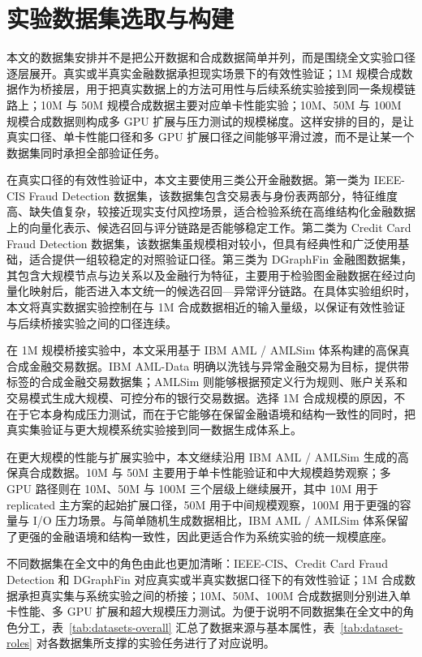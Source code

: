 \FloatBarrier

\section{实验数据集选取与构建}

本文的数据集安排并不是把公开数据和合成数据简单并列，而是围绕全文实验口径逐层展开。真实或半真实金融数据承担现实场景下的有效性验证；1M 规模合成数据作为桥接层，用于把真实数据上的方法可用性与后续系统实验接到同一条规模链路上；10M 与 50M 规模合成数据主要对应单卡性能实验；10M、50M 与 100M 规模合成数据则构成多 GPU 扩展与压力测试的规模梯度\citep{ibm_aml_data,ibm_amlsim}。这样安排的目的，是让真实口径、单卡性能口径和多 GPU 扩展口径之间能够平滑过渡，而不是让某一个数据集同时承担全部验证任务。

在真实口径的有效性验证中，本文主要使用三类公开金融数据。第一类为 IEEE-CIS Fraud Detection 数据集，该数据集包含交易表与身份表两部分，特征维度高、缺失值复杂，较接近现实支付风控场景，适合检验系统在高维结构化金融数据上的向量化表示、候选召回与评分链路是否能够稳定工作\citep{ieee_cis_fraud}。第二类为 Credit Card Fraud Detection 数据集，该数据集虽规模相对较小，但具有经典性和广泛使用基础，适合提供一组较稳定的对照验证口径\citep{dalpozzolo2015creditcard,creditcardfraud_kaggle}。第三类为 DGraphFin 金融图数据集，其包含大规模节点与边关系以及金融行为特征，主要用于检验图金融数据在经过向量化映射后，能否进入本文统一的候选召回---异常评分链路\citep{dgraphfin_paper,dgraphfin_site,dgraphfin_baseline}。在具体实验组织时，本文将真实数据实验控制在与 1M 合成数据相近的输入量级，以保证有效性验证与后续桥接实验之间的口径连续。

在 1M 规模桥接实验中，本文采用基于 IBM AML / AMLSim 体系构建的高保真合成金融交易数据。IBM AML-Data 明确以洗钱与异常金融交易为目标，提供带标签的合成金融交易数据集；AMLSim 则能够根据预定义行为规则、账户关系和交易模式生成大规模、可控分布的银行交易数据\citep{ibm_aml_data,ibm_amlsim}。选择 1M 合成规模的原因，不在于它本身构成压力测试，而在于它能够在保留金融语境和结构一致性的同时，把真实集验证与更大规模系统实验接到同一数据生成体系上。

在更大规模的性能与扩展实验中，本文继续沿用 IBM AML / AMLSim 生成的高保真合成数据。10M 与 50M 主要用于单卡性能验证和中大规模趋势观察；多 GPU 路径则在 10M、50M 与 100M 三个层级上继续展开，其中 10M 用于 replicated 主方案的起始扩展口径，50M 用于中间规模观察，100M 用于更强的容量与 I/O 压力场景。与简单随机生成数据相比，IBM AML / AMLSim 体系保留了更强的金融语境和结构一致性，因此更适合作为系统实验的统一规模底座。

不同数据集在全文中的角色由此也更加清晰：IEEE-CIS、Credit Card Fraud Detection 和 DGraphFin 对应真实或半真实数据口径下的有效性验证；1M 合成数据承担真实集与系统实验之间的桥接；10M、50M、100M 合成数据则分别进入单卡性能、多 GPU 扩展和超大规模压力测试。为便于说明不同数据集在全文中的角色分工，表~\ref{tab:datasets-overall} 汇总了数据来源与基本属性，表~\ref{tab:dataset-roles} 对各数据集所支撑的实验任务进行了对应说明。

